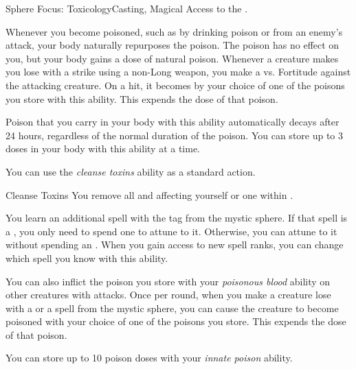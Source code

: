     \begin{feat}{Sphere Focus: Toxicology}{Casting, Magical}
        \featpre Access to the  .

         Whenever you become poisoned, such as by drinking poison or from an enemy's attack, your body naturally repurposes the poison.
        The poison has no effect on you, but your body gains a dose of natural poison.
        Whenever a creature makes you lose  with a  strike using a non-Long weapon, you make a  vs. Fortitude against the attacking creature.
        On a hit, it becomes  by your choice of one of the poisons you store with this ability.
        This expends the dose of that poison.

        Poison that you carry in your body with this ability automatically decays after 24 hours, regardless of the normal duration of the poison.
        You can store up to 3 doses in your body with this ability at a time.

         You can use the \textit{cleanse toxins} ability as a standard action.
        \begin{activeability}{Cleanse Toxins}
            \label{Cleanse Toxins}
            You remove all  and  affecting yourself or one  within \medrange.
        \end{activeability}

         You learn an additional spell with the  tag from the  mystic sphere.
        If that spell is a , you only need to spend one  to attune to it.
        Otherwise, you can attune to it without spending an .
        When you gain access to new spell ranks, you can change which spell you know with this ability.

         You can also inflict the poison you store with your \textit{poisonous blood} ability on other creatures with attacks.
        Once per round, when you make a creature lose  with a  or a spell from the  mystic sphere, you can cause the creature to become poisoned with your choice of one of the poisons you store.
        This expends the dose of that poison.

         You can store up to 10 poison doses with your \textit{innate poison} ability.
    \end{feat}

